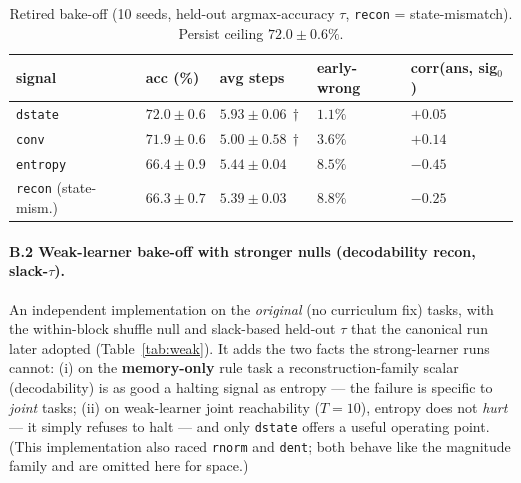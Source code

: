\documentclass{article}
\newcommand{\sig}[1]{\texttt{#1}}
\begin{document}
\begin{table}[h]
\caption{Retired bake-off (10 seeds, held-out argmax-accuracy $\tau$,
\sig{recon} = state-mismatch). Persist ceiling $72.0\pm0.6\%$.}
\label{tab:retired}
\centering
\small
\begin{tabular}{lllll}
\toprule
signal & acc (\%) & avg steps & early-wrong & corr(ans, sig$_0$) \\
\midrule
\sig{dstate} & $\mathbf{72.0\pm0.6}$ & $5.93\pm0.06\,\dagger$ & $\mathbf{1.1\%}$ & $+0.05$ \\
\sig{conv}   & $71.9\pm0.6$ & $5.00\pm0.58\,\dagger$ & $3.6\%$ & $+0.14$ \\
\sig{entropy} & $66.4\pm0.9$ & $5.44\pm0.04$ & $8.5\%$ & $-0.45$ \\
\sig{recon} (state-mism.) & $66.3\pm0.7$ & $5.39\pm0.03$ & $8.8\%$ & $-0.25$ \\
\bottomrule
\end{tabular}
\end{table}

\paragraph{B.2 Weak-learner bake-off with stronger nulls (decodability recon,
slack-$\tau$).} An independent implementation on the \emph{original} (no
curriculum fix) tasks, with the within-block shuffle null and slack-based
held-out $\tau$ that the canonical run later adopted (Table~\ref{tab:weak}).
It adds the two facts the strong-learner runs cannot: (i) on the
\textbf{memory-only} rule task a reconstruction-family scalar (decodability) is
as good a halting signal as entropy --- the failure is specific to \emph{joint}
tasks; (ii) on weak-learner joint reachability ($T{=}10$), entropy does not
\emph{hurt} --- it simply refuses to halt --- and only \sig{dstate} offers a
useful operating point. (This implementation also raced \sig{rnorm} and
\sig{dent}; both behave like the magnitude family and are omitted here for
space.)
\end{document}
